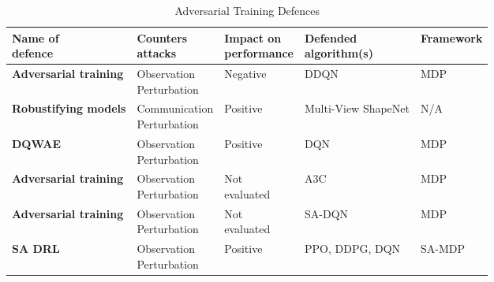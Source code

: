 \documentclass[conference,compsoc]{IEEEtran}
\begin{document}
\begin{table}[ht]
\centering
\caption{Adversarial Training Defences}
\resizebox{\columnwidth}{!}
{
\begin{tabular}{ p{2.0cm} p{2.0cm} p{1.7cm} p{1.3cm} l } 
\hline
\makecell[lt]{\textbf{Name of} \\ \textbf{defence}} & \makecell[lt]{\textbf{Counters} \\ \textbf{attacks}}  & \makecell[lt]{\textbf{Impact on} \\ \textbf{performance}} & \makecell[lt]{\textbf{Defended} \\ \textbf{algorithm(s)}} & \textbf{Framework}  \\ 
\hline
\textbf{Adversarial training \cite{korkmaz_adversarial_2021}}                                     & \makecell[lt]{Observation \\ Perturbation}     & Negative                       & DDQN                      & MDP         \\ 
\textbf{Robustifying models \cite{tu_adversarial_2021}}                                      & \makecell[lt]{Communication\\ Perturbation}  & Positive                       & Multi-View ShapeNet        & N/A           \\ 
\textbf{DQWAE \cite{ohashi_deep_2021}} & \makecell[lt]{Observation \\ Perturbation}     & Positive                       & DQN                        & MDP         \\ 
\textbf{Adversarial training \cite{kos_delving_2017}}                    & \makecell[lt]{Observation \\ Perturbation}     & \makecell[lt]{Not \\ evaluated}                  & A3C                        & MDP         \\ 
\textbf{Adversarial training \cite{korkmaz_investigating_2021}}                                     & \makecell[lt]{Observation \\ Perturbation}     & \makecell[lt]{Not \\ evaluated}                  & SA-DQN                     & MDP         \\ 
\textbf{SA DRL \cite{zhang_robust_2020-1}}                                    & \makecell[lt]{Observation \\ Perturbation}     & Positive                       & PPO, DDPG, DQN             & SA-MDP          \\ 

\end{tabular}}
\end{table}
\end{document}
